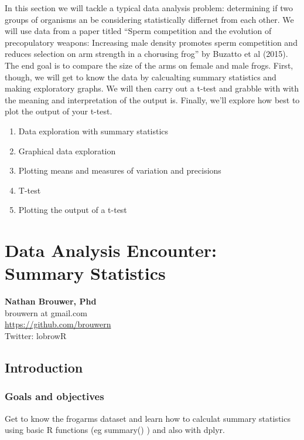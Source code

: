 \documentclass[]{book}
\providecommand{\tightlist}{%
  \setlength{\itemsep}{0pt}\setlength{\parskip}{0pt}}
\theoremstyle{definition}
\theoremstyle{definition}
\theoremstyle{definition}
\theoremstyle{remark}
\begin{document}
In this section we will tackle a typical data analysis problem:
determining if two groups of organisms an be considering statistically
differnet from each other. We will use data from a paper titled ``Sperm
competition and the evolution of precopulatory weapons: Increasing male
density promotes sperm competition and reduces selection on arm strength
in a chorusing frog'' by Buzatto et al (2015). The end goal is to
compare the size of the arms on female and male frogs. First, though, we
will get to know the data by calcualting summary statistics and making
exploratory graphs. We will then carry out a t-test and grabble with
with the meaning and interpretation of the output is. Finally, we'll
explore how best to plot the output of your t-test.

\begin{enumerate}
\def\labelenumi{\arabic{enumi}.}
\tightlist
\item
  Data exploration with summary statistics
\item
  Graphical data exploration
\item
  Plotting means and measures of variation and precisions
\item
  T-test
\item
  Plotting the output of a t-test
\end{enumerate}

\chapter{Data Analysis Encounter: Summary
Statistics}\label{data-analysis-encounter-summary-statistics}

\textbf{Nathan Brouwer, Phd}\\
brouwern at gmail.com\\
\url{https://github.com/brouwern}\\
Twitter: lobrowR

\section{Introduction}\label{introduction-8}

\subsection{Goals and objectives}\label{goals-and-objectives}

Get to know the frogarms dataset and learn how to calculat summary
statistics using basic R functions (eg summary() ) and also with dplyr.
\end{document}
